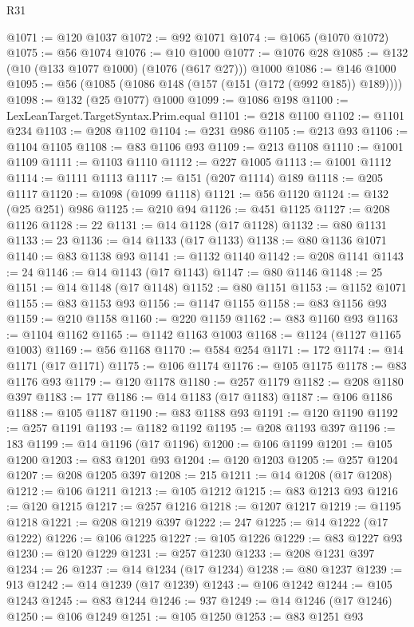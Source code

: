 \begin{lexlean}{R31}
\begin{coremodule}
@1071 := @120 @1037
@1072 := @92 @1071
@1074 := @1065 (@1070 @1072)
@1075 := @56 @1074
@1076 := @10 @1000
@1077 := @1076 @28
@1085 := @132 (@10 (@133 @1077 @1000) (@1076 (@617 @27))) @1000
@1086 := @146 @1000
@1095 := @56 (@1085 (@1086 @148 (@157 (@151 (@172 (@992 @185)) @189))))
@1098 := @132 (@25 @1077) @1000
@1099 := @1086 @198
@1100 := LexLeanTarget.TargetSyntax.Prim.equal
@1101 := @218 @1100
@1102 := @1101 @234
@1103 := @208 @1102
@1104 := @231 @986
@1105 := @213 @93
@1106 := @1104 @1105
@1108 := @83 @1106 @93
@1109 := @213 @1108
@1110 := @1001 @1109
@1111 := @1103 @1110
@1112 := @227 @1005
@1113 := @1001 @1112
@1114 := @1111 @1113
@1117 := @151 (@207 @1114) @189
@1118 := @205 @1117
@1120 := @1098 (@1099 @1118)
@1121 := @56 @1120
@1124 := @132 (@25 @251) @986
@1125 := @210 @94
@1126 := @451 @1125
@1127 := @208 @1126
@1128 := 22
@1131 := @14 @1128 (@17 @1128)
@1132 := @80 @1131
@1133 := 23
@1136 := @14 @1133 (@17 @1133)
@1138 := @80 @1136 @1071
@1140 := @83 @1138 @93
@1141 := @1132 @1140
@1142 := @208 @1141
@1143 := 24
@1146 := @14 @1143 (@17 @1143)
@1147 := @80 @1146
@1148 := 25
@1151 := @14 @1148 (@17 @1148)
@1152 := @80 @1151
@1153 := @1152 @1071
@1155 := @83 @1153 @93
@1156 := @1147 @1155
@1158 := @83 @1156 @93
@1159 := @210 @1158
@1160 := @220 @1159
@1162 := @83 @1160 @93
@1163 := @1104 @1162
@1165 := @1142 @1163 @1003
@1168 := @1124 (@1127 @1165 @1003)
@1169 := @56 @1168
@1170 := @584 @254
@1171 := 172
@1174 := @14 @1171 (@17 @1171)
@1175 := @106 @1174
@1176 := @105 @1175
@1178 := @83 @1176 @93
@1179 := @120 @1178
@1180 := @257 @1179
@1182 := @208 @1180 @397
@1183 := 177
@1186 := @14 @1183 (@17 @1183)
@1187 := @106 @1186
@1188 := @105 @1187
@1190 := @83 @1188 @93
@1191 := @120 @1190
@1192 := @257 @1191
@1193 := @1182 @1192
@1195 := @208 @1193 @397
@1196 := 183
@1199 := @14 @1196 (@17 @1196)
@1200 := @106 @1199
@1201 := @105 @1200
@1203 := @83 @1201 @93
@1204 := @120 @1203
@1205 := @257 @1204
@1207 := @208 @1205 @397
@1208 := 215
@1211 := @14 @1208 (@17 @1208)
@1212 := @106 @1211
@1213 := @105 @1212
@1215 := @83 @1213 @93
@1216 := @120 @1215
@1217 := @257 @1216
@1218 := @1207 @1217
@1219 := @1195 @1218
@1221 := @208 @1219 @397
@1222 := 247
@1225 := @14 @1222 (@17 @1222)
@1226 := @106 @1225
@1227 := @105 @1226
@1229 := @83 @1227 @93
@1230 := @120 @1229
@1231 := @257 @1230
@1233 := @208 @1231 @397
@1234 := 26
@1237 := @14 @1234 (@17 @1234)
@1238 := @80 @1237
@1239 := 913
@1242 := @14 @1239 (@17 @1239)
@1243 := @106 @1242
@1244 := @105 @1243
@1245 := @83 @1244
@1246 := 937
@1249 := @14 @1246 (@17 @1246)
@1250 := @106 @1249
@1251 := @105 @1250
@1253 := @83 @1251 @93

\end{coremodule}
\end{lexlean}
